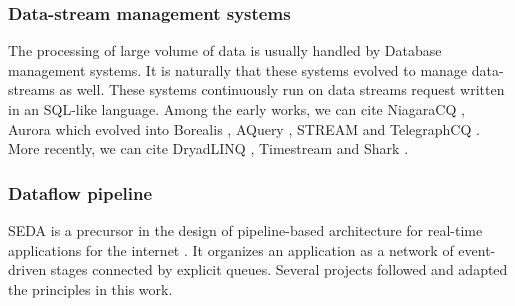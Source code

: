 \subsubsection{Data-stream management systems}

The processing of large volume of data is usually handled by Database management systems.
It is naturally that these systems evolved to manage data-streams as well.
These systems continuously run on data streams request written in an SQL-like language.
Among the early works, we can cite NiagaraCQ \cite{Chen2000,Naughton2001}, Aurora \cite{Abadi2003,Abadi2003a,Balakrishnan2004} which evolved into Borealis \cite{Abadi2005}, AQuery \cite{Lerner2003}, STREAM \cite{Arasu2003,Arasu2005} and TelegraphCQ \cite{Krishnamurthy2003,Chandrasekaran2003}.
More recently, we can cite DryadLINQ \cite{Isard2007,Yu2009}, Timestream \cite{Qian2013} and Shark \cite{Xin2013}.









\subsubsection{Dataflow pipeline}

SEDA is a precursor in the design of pipeline-based architecture for real-time applications for the internet \cite{Welsh2001}.
It organizes an application as a network of event-driven stages connected by explicit queues.
Several projects followed and adapted the principles in this work.

